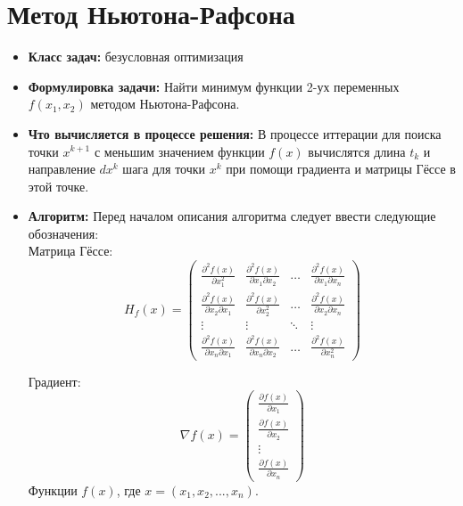 \pagebreak


\section{Метод Ньютона-Рафсона}

\begin{itemize}
    \item {\bfseries Класс задач:} безусловная оптимизация
    
    
    \item {\bfseries Формулировка задачи:} Найти минимум функции 2-ух переменных $f(x_1, x_2)$ методом Ньютона-Рафсона.
    
    
    \item {\bfseries Что вычисляется в процессе решения:}
    В процессе иттерации для поиска точки $x^{k+1}$ с меньшим значением функции $f(x)$ вычислятся длина $t_k$ и направление $dx^k$ шага для точки $x^k$ при помощи градиента и матрицы Гёссе в этой точке.
    
    
    \item {\bfseries Алгоритм:}
    Перед началом описания алгоритма следует ввести следующие обозначения: \\
    Матрица Гёссе:
    \begin{equation*}
    H_{f}(x) = \left(
    \begin{array}{cccc}
        \frac{\partial^2 f(x)}{\partial x^{2}_{1}} & \frac{\partial^2 f(x)}{\partial x_1 \partial x_2} & \ldots & \frac{\partial^2 f(x)}{\partial x_1 \partial x_n}\\
        \frac{\partial^2 f(x)}{\partial x_{2} \partial x_1} & \frac{\partial^2 f(x)}{\partial x^{2}_{2}} & \ldots & \frac{\partial^2 f(x)}{\partial x_2 \partial x_n}\\
        \vdots & \vdots & \ddots & \vdots\\
        \frac{\partial^2 f(x)}{\partial x_n \partial x_1} & \frac{\partial^2 f(x)}{\partial x_n \partial x_2} & \ldots & \frac{\partial^2 f(x)}{\partial x^{2}_{n}}
    \end{array}
    \right)
    \end{equation*}
    
    Градиент:
    \begin{equation*}
    \nabla f(x) = \left(
    \begin{array}{cccc}
        \frac{\partial f(x)}{\partial x_1}\\
        \frac{\partial f(x)}{\partial x_2}\\
        \vdots\\
        \frac{\partial f(x)}{\partial x_n}
    \end{array}
    \right)
    \end{equation*}
    Функции $f(x)$, где $x = (x_1, x_2, ..., x_n)$. \\
    

\end{itemize}
